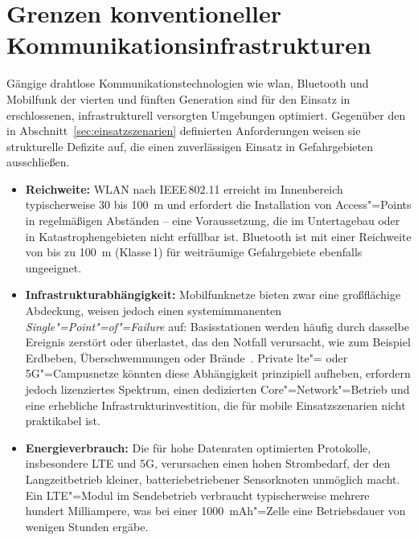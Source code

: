 \section{Grenzen konventioneller Kommunikationsinfrastrukturen}
\label{sec:komm-versagen}

Gängige drahtlose Kommunikationstechnologien wie \acrshort{wlan}, Bluetooth und
Mobilfunk der vierten und fünften Generation sind für den Einsatz in erschlossenen,
infrastrukturell versorgten Umgebungen optimiert. Gegenüber den in
Abschnitt~\ref{sec:einsatzszenarien} definierten Anforderungen weisen sie
strukturelle Defizite auf, die einen zuverlässigen Einsatz in Gefahrgebieten
ausschließen.

\begin{itemize}
    \item \textbf{Reichweite:} WLAN nach IEEE\,802.11 erreicht im
    Innenbereich typischerweise 30 bis \SI{100}{\m} und erfordert die Installation
    von Access"=Points in regelmäßigen Abständen -- eine Voraussetzung, die im
    Untertagebau oder in Katastrophengebieten nicht erfüllbar ist. Bluetooth ist
    mit einer Reichweite von bis zu \SI{100}{\m} (Klasse\,1) für weiträumige
    Gefahrgebiete ebenfalls ungeeignet.

    \item \textbf{Infrastrukturabhängigkeit:} Mobilfunknetze bieten zwar eine
    großflächige Abdeckung, weisen jedoch einen systemimmanenten
    \textit{Single"=Point"=of"=Failure} auf: Basisstationen werden häufig durch
    dasselbe Ereignis zerstört oder überlastet, das den Notfall verursacht, wie zum Beispiel
    Erdbeben, Überschwemmungen oder Brände~\cite{sciulloDesignPerformanceEvaluation2020}. Private %
    \acrshort{lte}"= oder 5G"=Campusnetze könnten diese Abhängigkeit prinzipiell
    aufheben, erfordern jedoch lizenziertes Spektrum, einen dedizierten
    Core"=Network"=Betrieb und eine erhebliche Infrastrukturinvestition, die
    für mobile Einsatzszenarien nicht praktikabel ist.

    \item \textbf{Energieverbrauch:} Die für hohe Datenraten optimierten
    Protokolle, insbesondere LTE und 5G, verursachen einen hohen
    Strombedarf, der den Langzeitbetrieb kleiner, batteriebetriebener Sensorknoten
    unmöglich macht. Ein LTE"=Modul im Sendebetrieb verbraucht typischerweise
    mehrere hundert Milliampere, was bei einer \SI{1000}{mAh}"=Zelle eine Betriebsdauer von wenigen Stunden ergäbe.
\end{itemize}

